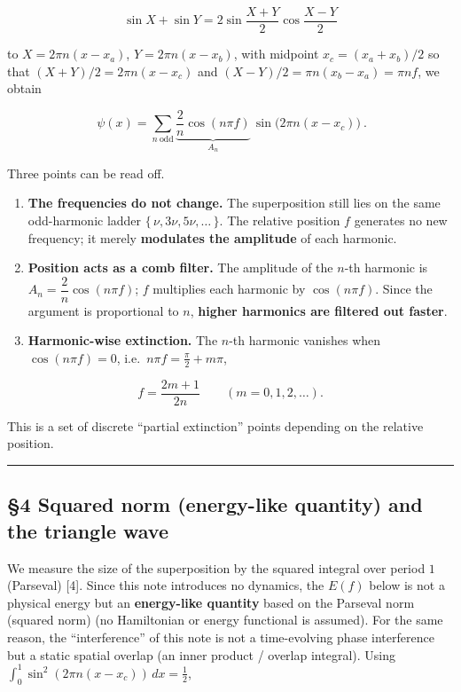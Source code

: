 \documentclass[
]{article}
\begin{document}
\[\sin X+\sin Y=2\sin\frac{X+Y}{2}\cos\frac{X-Y}{2}\]

to \(X=2\pi n(x-x_a)\), \(Y=2\pi n(x-x_b)\), with midpoint
\(x_c=(x_a+x_b)/2\) so that \((X+Y)/2=2\pi n(x-x_c)\) and
\((X-Y)/2=\pi n(x_b-x_a)=\pi n f\), we obtain

\[\boxed{\ \psi(x)=\sum_{n\ \mathrm{odd}}\underbrace{\frac{2}{n}\cos(n\pi f)}_{A_n}\,\sin\!\big(2\pi n(x-x_c)\big)\ }.\]

Three points can be read off.

\begin{enumerate}
\def\labelenumi{\arabic{enumi}.}
\item
  \textbf{The frequencies do not change.} The superposition still lies
  on the same odd-harmonic ladder \(\{\,\nu,3\nu,5\nu,\dots\,\}\). The
  relative position \(f\) generates no new frequency; it merely
  \textbf{modulates the amplitude} of each harmonic.
\item
  \textbf{Position acts as a comb filter.} The amplitude of the \(n\)-th
  harmonic is \(A_n=\dfrac{2}{n}\cos(n\pi f)\); \(f\) multiplies each
  harmonic by \(\cos(n\pi f)\). Since the argument is proportional to
  \(n\), \textbf{higher harmonics are filtered out faster}.
\item
  \textbf{Harmonic-wise extinction.} The \(n\)-th harmonic vanishes when
  \(\cos(n\pi f)=0\), i.e.~\(n\pi f=\tfrac{\pi}{2}+m\pi\),
\end{enumerate}

\[f=\frac{2m+1}{2n}\qquad(m=0,1,2,\dots).\]

This is a set of discrete ``partial extinction'' points depending on the
relative position.

\begin{center}\rule{0.5\linewidth}{0.5pt}\end{center}

\subsection{§4 Squared norm (energy-like quantity) and the triangle
wave}\label{squared-norm-energy-like-quantity-and-the-triangle-wave}

We measure the size of the superposition by the squared integral over
period \(1\) (Parseval) {[}4{]}. Since this note introduces no dynamics,
the \(E(f)\) below is not a physical energy but an \textbf{energy-like
quantity} based on the Parseval norm (squared norm) (no Hamiltonian or
energy functional is assumed). For the same reason, the ``interference''
of this note is not a time-evolving phase interference but a static
spatial overlap (an inner product / overlap integral). Using
\(\int_0^1\sin^2(2\pi n(x-x_c))\,dx=\tfrac12\),
\end{document}
